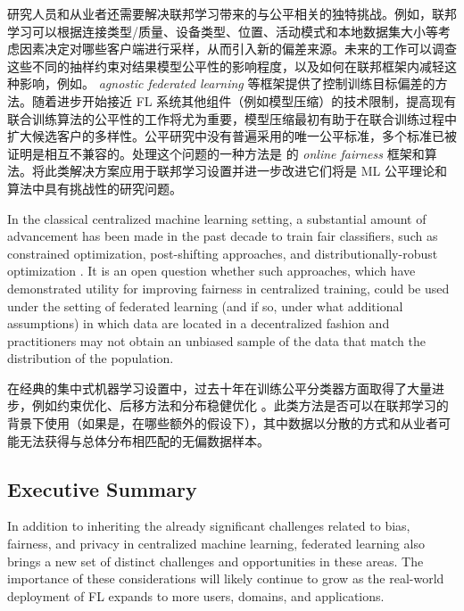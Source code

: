 研究人员和从业者还需要解决联邦学习带来的与公平相关的独特挑战。例如，联邦学习可以根据连接类型/质量、设备类型、位置、活动模式和本地数据集大小等考虑因素决定对哪些客户端进行采样，从而引入新的偏差来源。未来的工作可以调查这些不同的抽样约束对结果模型公平性的影响程度，以及如何在联邦框架内减轻这种影响，例如\cite{li2019fair,fair_quantile,moreau}。 \emph{agnostic federated learning} \cite{Mohri2019} 等框架提供了控制训练目标偏差的方法。随着进步开始接近 FL 系统其他组件（例如模型压缩）的技术限制，提高现有联合训练算法的公平性的工作将尤为重要，模型压缩最初有助于在联合训练过程中扩大候选客户的多样性。公平研究中没有普遍采用的唯一公平标准，多个标准已被证明是相互不兼容的。处理这个问题的一种方法是 \citet{AwasthiCortesMansourMohri2020} 的 \emph{online fairness} 框架和算法。将此类解决方案应用于联邦学习设置并进一步改进它们将是 ML 公平理论和算法中具有挑战性的研究问题。


In the classical centralized machine learning setting, a substantial amount of advancement has been made in the past decade to train fair classifiers, such as constrained optimization, post-shifting approaches, and distributionally-robust optimization \cite{hardt2016, zafar2017, hashimoto2018fairness}. It is an open question whether such approaches, which have demonstrated utility for improving fairness in centralized training, could be used under the setting of federated learning (and if so, under what additional assumptions) in which data are located in a decentralized fashion and practitioners may not obtain an unbiased sample of the data that match the distribution of the population.  

在经典的集中式机器学习设置中，过去十年在训练公平分类器方面取得了大量进步，例如约束优化、后移方法和分布稳健优化 \cite{hardt2016, zafar2017, hashimoto2018fairness}。此类方法是否可以在联邦学习的背景下使用（如果是，在哪些额外的假设下），其中数据以分散的方式和从业者可能无法获得与总体分布相匹配的无偏数据样本。

\subsection{Executive Summary}

In addition to inheriting the already significant challenges related to bias, fairness, and privacy in centralized machine learning, federated learning also brings a new set of distinct challenges and opportunities in these areas. The importance of these considerations will likely continue to grow as the real-world deployment of FL expands to more users, domains, and applications.

